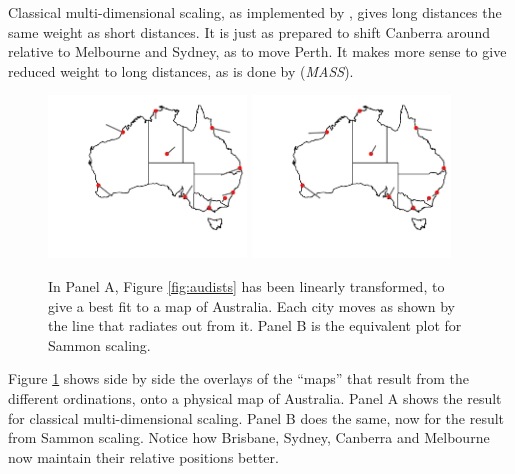 Classical multi-dimensional scaling, as implemented by
 , gives long distances the same weight as short
 distances.  It is just as prepared to shift Canberra around relative
 to Melbourne and Sydney, as to move Perth.  It makes more sense to
 give reduced weight to long distances, as is done by 
 (\textit{MASS}).




\begin{figure}[h]
\begin{Schunk}


\centerline{\includegraphics[width=0.47\textwidth]{figs/12-au-both-1} \includegraphics[width=0.47\textwidth]{figs/12-au-both-2} }

\end{Schunk}
      \caption{In Panel A, Figure \ref{fig:audists} has been linearly
        transformed, to give a best fit to a map of Australia.  Each city
        moves as shown by the line that radiates out from it.  Panel B
        is the equivalent plot for Sammon scaling.
\label{fig:aufit}}
 \end{figure}
 Figure \ref{fig:aufit} shows side by side the overlays of the
 ``maps'' that result from the different ordinations, onto a physical
 map of Australia.  Panel A shows the result for classical
 multi-dimensional scaling.  Panel B does the same, now for the result
 from Sammon scaling.  Notice how Brisbane, Sydney, Canberra and
 Melbourne now maintain their relative positions better.



